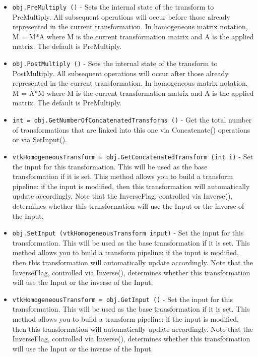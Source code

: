 \begin{itemize}
\item  \verb|obj.PreMultiply ()| -  Sets the internal state of the transform to PreMultiply. All subsequent
 operations will occur before those already represented in the
 current transformation.  In homogeneous matrix notation, M = M*A where
 M is the current transformation matrix and A is the applied matrix.
 The default is PreMultiply.

\item  \verb|obj.PostMultiply ()| -  Sets the internal state of the transform to PostMultiply. All subsequent
 operations will occur after those already represented in the
 current transformation.  In homogeneous matrix notation, M = A*M where
 M is the current transformation matrix and A is the applied matrix.
 The default is PreMultiply.

\item  \verb|int = obj.GetNumberOfConcatenatedTransforms ()| -  Get the total number of transformations that are linked into this
 one via Concatenate() operations or via SetInput().

\item  \verb|vtkHomogeneousTransform = obj.GetConcatenatedTransform (int i)| -  Set the input for this transformation.  This will be used as the
 base transformation if it is set.  This method allows you to build
 a transform pipeline: if the input is modified, then this transformation
 will automatically update accordingly.  Note that the InverseFlag,
 controlled via Inverse(), determines whether this transformation
 will use the Input or the inverse of the Input.

\item  \verb|obj.SetInput (vtkHomogeneousTransform input)| -  Set the input for this transformation.  This will be used as the
 base transformation if it is set.  This method allows you to build
 a transform pipeline: if the input is modified, then this transformation
 will automatically update accordingly.  Note that the InverseFlag,
 controlled via Inverse(), determines whether this transformation
 will use the Input or the inverse of the Input.

\item  \verb|vtkHomogeneousTransform = obj.GetInput ()| -  Set the input for this transformation.  This will be used as the
 base transformation if it is set.  This method allows you to build
 a transform pipeline: if the input is modified, then this transformation
 will automatically update accordingly.  Note that the InverseFlag,
 controlled via Inverse(), determines whether this transformation
 will use the Input or the inverse of the Input.


\end{itemize}
